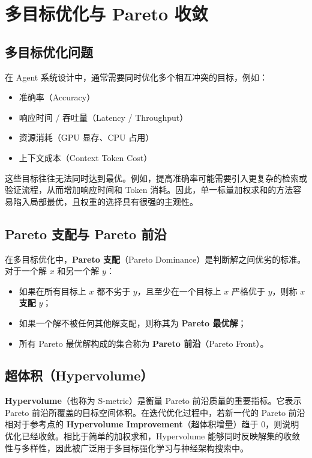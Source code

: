 \section{多目标优化与 Pareto 收敛}

\subsection{多目标优化问题}

在 Agent 系统设计中，通常需要同时优化多个相互冲突的目标，例如：
\begin{itemize}
    \item 准确率（Accuracy）
    \item 响应时间 / 吞吐量（Latency / Throughput）
    \item 资源消耗（GPU 显存、CPU 占用）
    \item 上下文成本（Context Token Cost）
\end{itemize}

这些目标往往无法同时达到最优。例如，提高准确率可能需要引入更复杂的检索或验证流程，从而增加响应时间和 Token 消耗。因此，单一标量加权求和的方法容易陷入局部最优，且权重的选择具有很强的主观性。

\subsection{Pareto 支配与 Pareto 前沿}

在多目标优化中，\textbf{Pareto 支配}（Pareto Dominance）是判断解之间优劣的标准。对于一个解 $x$ 和另一个解 $y$：
\begin{itemize}
    \item 如果在所有目标上 $x$ 都不劣于 $y$，且至少在一个目标上 $x$ 严格优于 $y$，则称 $x$ \textbf{支配} $y$；
    \item 如果一个解不被任何其他解支配，则称其为 \textbf{Pareto 最优解}；
    \item 所有 Pareto 最优解构成的集合称为 \textbf{Pareto 前沿}（Pareto Front）。
\end{itemize}

\subsection{超体积（Hypervolume）}

\textbf{Hypervolume}（也称为 S-metric）是衡量 Pareto 前沿质量的重要指标。它表示 Pareto 前沿所覆盖的目标空间体积。在迭代优化过程中，若新一代的 Pareto 前沿相对于参考点的 \textbf{Hypervolume Improvement}（超体积增量）趋于 0，则说明优化已经收敛。相比于简单的加权求和，Hypervolume 能够同时反映解集的收敛性与多样性，因此被广泛用于多目标强化学习与神经架构搜索中。


